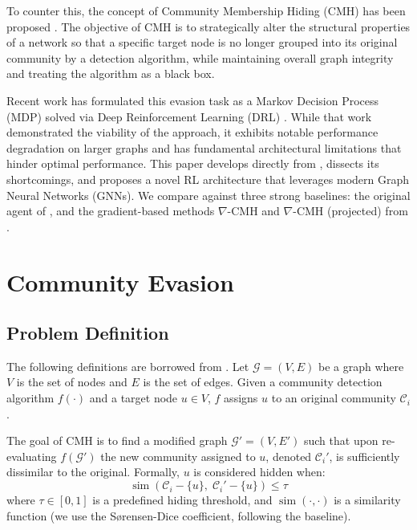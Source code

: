\documentclass[twocolumn,a4paper]{article}
\begin{document}
To counter this, the concept of Community Membership Hiding (CMH) has been
proposed \parencite{bernini-2024}. The objective of CMH is to strategically
alter the structural properties of a network so that a specific target node is
no longer grouped into its original community by a detection algorithm, while
maintaining overall graph integrity and treating the algorithm as a black box.

Recent work has formulated this evasion task as a Markov Decision Process (MDP)
solved via Deep Reinforcement Learning (DRL) \parencite{bernini-2024}. While
that work demonstrated the viability of the approach, it exhibits notable
performance degradation on larger graphs and has fundamental architectural
limitations that hinder optimal performance. This paper develops directly from
\parencite{bernini-2024}, dissects its shortcomings, and proposes a novel RL
architecture that leverages modern Graph Neural Networks (GNNs). We compare
against three strong baselines: the original agent of \parencite{bernini-2024},
and the gradient-based methods $\nabla$-CMH and $\nabla$-CMH (projected) from
\parencite{silvestri2025righthidemaskingcommunity}.


\section{Community Evasion}

\subsection{Problem Definition}

The following definitions are borrowed from \parencite{bernini-2024}. Let
$\mathcal{G} = (V, E)$ be a graph where $V$ is the set of nodes and $E$ is the
set of edges. Given a community detection algorithm $f(\cdot)$ and a target
node $u \in V$, $f$ assigns $u$ to an original community $\mathcal{C}_i$.

The goal of CMH is to find a modified graph $\mathcal{G}' = (V, E')$ such that
upon re-evaluating $f(\mathcal{G}')$ the new community assigned to $u$, denoted
$\mathcal{C}_i'$, is sufficiently dissimilar to the original. Formally, $u$ is
considered hidden when:
\begin{equation}
  \operatorname{sim}(\mathcal{C}_i - \{u\},\; \mathcal{C}_i' - \{u\}) \leq \tau
  \label{eq:hiding}
\end{equation}
where $\tau \in [0,1]$ is a predefined hiding threshold, and
$\operatorname{sim}(\cdot,\cdot)$ is a similarity function (we use the
Sørensen-Dice coefficient, following the baseline).
\end{document}
